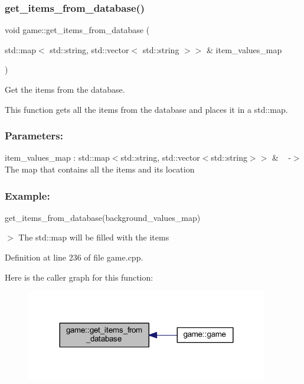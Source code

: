 \subsubsection{\texorpdfstring{get\+\_\+items\+\_\+from\+\_\+database()}{get\_items\_from\_database()}}
{\footnotesize\ttfamily void game\+::get\+\_\+items\+\_\+from\+\_\+database (\begin{DoxyParamCaption}\item[{std\+::map$<$ std\+::string, std\+::vector$<$ std\+::string $>$$>$ \&}]{item\+\_\+values\+\_\+map }\end{DoxyParamCaption})}



Get the items from the database. 

This function gets all the items from the database and places it in a std\+::map.~\newline


\subsubsection*{Parameters\+: }

item\+\_\+values\+\_\+map \+: std\+::map$<$std\+::string, std\+::vector$<$std\+::string$>$$>$ \& ~\newline
-\/$>$ The map that contains all the items and its location

\subsubsection*{Example\+: }

get\+\_\+items\+\_\+from\+\_\+database(background\+\_\+values\+\_\+map) ~\newline

\begin{DoxyItemize}
\item $>$ The std\+::map will be filled with the items 
\end{DoxyItemize}

Definition at line 236 of file game.\+cpp.

Here is the caller graph for this function\+:
\nopagebreak
\begin{figure}[H]
\begin{center}
\leavevmode
\includegraphics[width=300pt]{classgame_a0eb06f984d04128ba7fba6fcca04bda3_icgraph}
\end{center}
\end{figure}
\mbox{\label{classgame_a61adfafa4d31548fc94c853f10b9bf3b}} 
